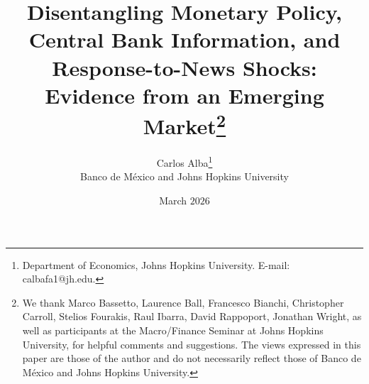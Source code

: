 \documentclass[12pt, reqno]{article}
\begin{document}
\title{\vspace{-3.5cm}Disentangling Monetary Policy, Central Bank Information, and Response-to-News Shocks: Evidence from an Emerging Market\footnote{We thank Marco Bassetto, Laurence Ball, Francesco Bianchi, Christopher Carroll, Stelios Fourakis, Raul Ibarra, David Rappoport, Jonathan Wright, as well as participants at the Macro/Finance Seminar at Johns Hopkins University, for helpful comments and suggestions. The views expressed in this paper are those of the author and do not necessarily reflect those of Banco de México and Johns Hopkins University.}}

\author{{{Carlos Alba}\footnote{Department of Economics, Johns Hopkins University. E-mail: calbafa1@jh.edu.}}
\\
{\small{Banco de México and Johns Hopkins University}}}



\date{March $2026$} \maketitle
\vspace{-1cm}
\end{document}
